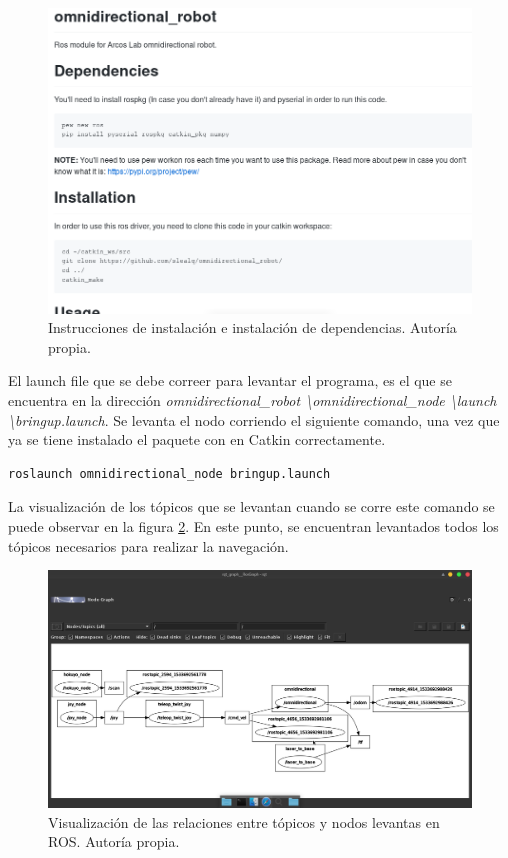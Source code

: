 \begin{figure}[H]
\centering
\includegraphics[scale=0.5]{imagenes/omnidireccional_instalacion.png}
\caption{Instrucciones de instalación e instalación de dependencias.  Autoría propia.}
\label{F:repositorio_installacion}
\end{figure}

El launch file que se debe correer para levantar el programa, es el que se encuentra en la dirección \textit{omnidirectional\_robot \textbackslash omnidirectional\_node \textbackslash launch \textbackslash bringup.launch}. Se levanta el nodo corriendo el siguiente comando, una vez que ya se tiene instalado el paquete con en Catkin correctamente.

\begin{lstlisting}
roslaunch omnidirectional_node bringup.launch
\end{lstlisting}

La visualización de los tópicos que se levantan cuando se corre este comando se puede observar en la figura \ref{F:rqtgraphomni}. En este punto, se encuentran levantados todos los tópicos necesarios para realizar la navegación.

\begin{figure}[H]
\centering
\includegraphics[scale=0.3]{imagenes/omnidirectional_rqtgraph.png}
\caption{Visualización de las relaciones entre tópicos y nodos levantas en ROS. Autoría propia.}
\label{F:rqtgraphomni}
\end{figure}


